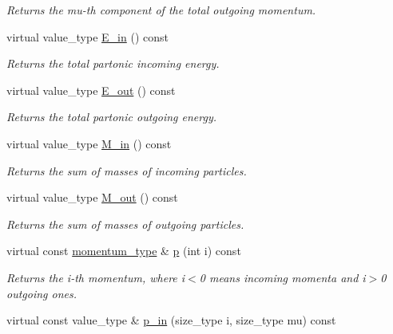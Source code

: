 \begin{DoxyCompactItemize}
\begin{DoxyCompactList}\small\item\em Returns the mu-\/th component of the total outgoing momentum. \end{DoxyCompactList}\item 
\hypertarget{a00442_a9930f8e4048c4e777ecf488c76bd7e25}{virtual value\-\_\-type \hyperlink{a00442_a9930f8e4048c4e777ecf488c76bd7e25}{E\-\_\-in} () const }\label{a00442_a9930f8e4048c4e777ecf488c76bd7e25}

\begin{DoxyCompactList}\small\item\em Returns the total partonic incoming energy. \end{DoxyCompactList}\item 
\hypertarget{a00442_a1294d82ea42d2f0123c126c61dc5589d}{virtual value\-\_\-type \hyperlink{a00442_a1294d82ea42d2f0123c126c61dc5589d}{E\-\_\-out} () const }\label{a00442_a1294d82ea42d2f0123c126c61dc5589d}

\begin{DoxyCompactList}\small\item\em Returns the total partonic outgoing energy. \end{DoxyCompactList}\item 
\hypertarget{a00442_a701fd5ce697720bf36528902446b048f}{virtual value\-\_\-type \hyperlink{a00442_a701fd5ce697720bf36528902446b048f}{M\-\_\-in} () const }\label{a00442_a701fd5ce697720bf36528902446b048f}

\begin{DoxyCompactList}\small\item\em Returns the sum of masses of incoming particles. \end{DoxyCompactList}\item 
\hypertarget{a00442_ac22c85f2216760d8b616bb2b36578b14}{virtual value\-\_\-type \hyperlink{a00442_ac22c85f2216760d8b616bb2b36578b14}{M\-\_\-out} () const }\label{a00442_ac22c85f2216760d8b616bb2b36578b14}

\begin{DoxyCompactList}\small\item\em Returns the sum of masses of outgoing particles. \end{DoxyCompactList}\item 
virtual const \hyperlink{a00559}{momentum\-\_\-type} \& \hyperlink{a00442_a2b06ea836491c920c2eb03ca6785e453}{p} (int i) const 
\begin{DoxyCompactList}\small\item\em Returns the i-\/th momentum, where i$<$0 means incoming momenta and i$>$0 outgoing ones. \end{DoxyCompactList}\item 
\hypertarget{a00442_a93e2650607db42a9cc3581e5ac937e6c}{virtual const value\-\_\-type \& \hyperlink{a00442_a93e2650607db42a9cc3581e5ac937e6c}{p\-\_\-in} (size\-\_\-type i, size\-\_\-type mu) const }\label{a00442_a93e2650607db42a9cc3581e5ac937e6c}


\end{DoxyCompactItemize}
